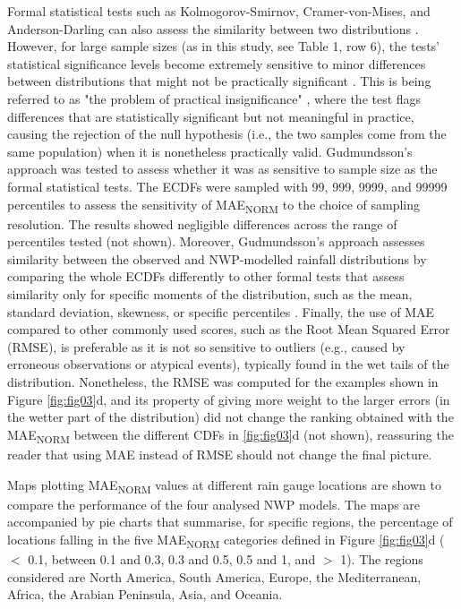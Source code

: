\documentclass{ametsocV6.1}
\begin{document}
Formal statistical tests such as Kolmogorov-Smirnov, Cramer-von-Mises, and Anderson-Darling can also assess the similarity between two distributions \citep{Stephens1974}. However, for large sample sizes (as in this study, see Table 1, row 6), the tests' statistical significance levels become extremely sensitive to minor differences between distributions that might not be practically significant \citep{Engmann2011, Janssen2000}. This is being referred to as "the problem of practical insignificance" \citep{Kirk1996}, where the test flags differences that are statistically significant but not meaningful in practice, causing the rejection of the null hypothesis (i.e., the two samples come from the same population) when it is nonetheless practically valid. Gudmundsson's approach was tested to assess whether it was as sensitive to sample size as the formal statistical tests. The ECDFs were sampled with 99, 999, 9999, and 99999 percentiles to assess the sensitivity of MAE\textsubscript{NORM} to the choice of sampling resolution. The results showed negligible differences across the range of percentiles tested (not shown). Moreover, Gudmundsson's approach assesses similarity between the observed and NWP-modelled rainfall distributions by comparing the whole ECDFs differently to other formal tests that assess similarity only for specific moments of the distribution, such as the mean, standard deviation, skewness, or specific percentiles \citep{AnthanahalliNanjegowda2022}. Finally, the use of MAE compared to other commonly used scores, such as the Root Mean Squared Error (RMSE), is preferable as it is not so sensitive to outliers (e.g., caused by erroneous observations or atypical events), typically found in the wet tails of the distribution. Nonetheless, the RMSE was computed for the examples shown in Figure \ref{fig:fig03}d, and its property of giving more weight to the larger errors (in the wetter part of the distribution) did not change the ranking obtained with the MAE\textsubscript{NORM} between the different CDFs in \ref{fig:fig03}d (not shown), reassuring the reader that using MAE instead of RMSE should not change the final picture.

Maps plotting MAE\textsubscript{NORM} values at different rain gauge locations are shown to compare the performance of the four analysed NWP models. The maps are accompanied by pie charts that summarise, for specific regions, the percentage of locations falling in the five MAE\textsubscript{NORM} categories defined in Figure \ref{fig:fig03}d (${<}$ 0.1, between 0.1 and 0.3, 0.3 and 0.5, 0.5 and 1, and ${>}$ 1). The regions considered are North America, South America, Europe, the Mediterranean, Africa, the Arabian Peninsula, Asia, and Oceania. 
\end{document}
